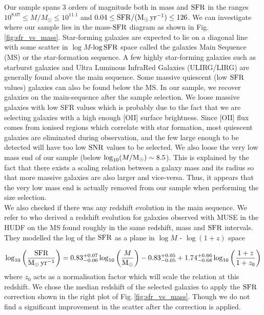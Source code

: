 Our sample spans 3 orders of magnitude both in mass and $\rm{SFR}$ in the ranges $10^{8.07} \leq M / \si{M_{\odot}} \leq  10^{11.1}$ and $0.04 \leq \rm{SFR} / ( \si{M_{\odot}. yr^{-1} }) \leq 126$. We can investigate where our sample lies in the mass-$\rm{SFR}$ diagram as shown in Fig.\,\ref{fig:sfr_vs_mass}. Star-forming galaxies are expected to lie on a diagonal line with some scatter in $\log M$-$\log \rm{SFR}$ space called the galaxies Main Sequence (MS) or the star-formation sequence. A few highly star-forming galaxies such as starburst galaxies and Ultra Luminous InfraRed Galaxies (ULIRG/LIRG) are generally found above the main sequence. Some massive quiescent (low $\rm{SFR}$ values) galaxies can also be found below the MS. In our sample, we recover galaxies on the main-sequence after the sample selection. We loose massive galaxies with low SFR values which is probably due to the fact that we are selecting galaxies with a high enough [OII] surface brightness. Since [OII] flux comes from ionised regions which correlate with star formation, most quiescent galaxies are eliminated during observation, and the few large enough to be detected will have too low $\rm{SNR}$ values to be selected. We also loose the very low mass end of our sample (below $\log_{10} (M / \rm{M_{\odot}}) \sim 8.5$). This is explained by the fact that there exists a scaling relation between a galaxy mass and its radius so that more massive galaxies are also larger and vice-versa. Thus, it appears that the very low mass end is actually removed from our sample when performing the size selection.\\

We also checked if there was any redshift evolution in the main sequence. We refer to  who derived a redshift evolution for galaxies observed with MUSE in the HUDF on the MS found roughly in the same redshift, mass and $\rm{SFR}$ intervals. They modelled the log of the $\rm{SFR}$ as a plane in $\log M$ - $\log (1 + z)$ space 

\begin{equation}
	\log_{10} \left ( \frac{\rm{SFR}}{\si{M_{\odot} . yr^{-1}}} \right ) = 0.83_{-0.06}^{+0.07} \log_{10} \left ( \frac{M}{\si{M_{\odot}}} \right ) - 0.83^{+0.05}_{-0.05} + 1.74_{-0.68}^{+0.66} \log_{10} \left ( \frac{1+z}{1+z_0} \right )
	\label{eq:SFR_corrected_redshift}
\end{equation}
where $z_0$ acts as a normalisation factor which will scale the relation at this redshift. We chose the median redshift of the selected galaxies to apply the $\rm{SFR}$ correction shown in the right plot of Fig.\,\ref{fig:sfr_vs_mass}. Though we do not find a significant improvement in the scatter after the correction is applied.



 

